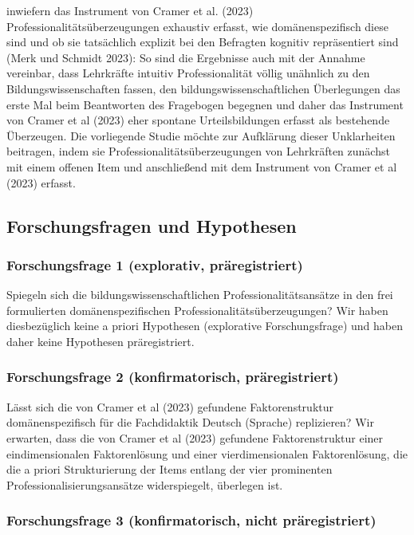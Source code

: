 \documentclass[
  letterpaper,
  DIV=11]{scrartcl}
\begin{document}
inwiefern das Instrument von Cramer et al. (2023)
Professionalitätsüberzeugungen exhaustiv erfasst, wie domänenspezifisch
diese sind und ob sie tatsächlich explizit bei den Befragten kognitiv
repräsentiert sind (Merk und Schmidt 2023): So sind die Ergebnisse auch
mit der Annahme vereinbar, dass Lehrkräfte intuitiv Professionalität
völlig unähnlich zu den Bildungswissenschaften fassen, den
bildungswissenschaftlichen Überlegungen das erste Mal beim Beantworten
des Fragebogen begegnen und daher das Instrument von Cramer et al (2023)
eher spontane Urteilsbildungen erfasst als bestehende Überzeugen. Die
vorliegende Studie möchte zur Aufklärung dieser Unklarheiten beitragen,
indem sie Professionalitätsüberzeugungen von Lehrkräften zunächst mit
einem offenen Item und anschließend mit dem Instrument von Cramer et al
(2023) erfasst.

\subsection{Forschungsfragen und
Hypothesen}\label{forschungsfragen-und-hypothesen}

\subsubsection{Forschungsfrage 1 (explorativ,
präregistriert)}\label{forschungsfrage-1-explorativ-pruxe4registriert}

Spiegeln sich die bildungswissenschaftlichen Professionalitätsansätze in
den frei formulierten domänenspezifischen
Professionalitätsüberzeugungen? Wir haben diesbezüglich keine a priori
Hypothesen (explorative Forschungsfrage) und haben daher keine
Hypothesen präregistriert.

\subsubsection{Forschungsfrage 2 (konfirmatorisch,
präregistriert)}\label{forschungsfrage-2-konfirmatorisch-pruxe4registriert}

Lässt sich die von Cramer et al (2023) gefundene Faktorenstruktur
domänenspezifisch für die Fachdidaktik Deutsch (Sprache) replizieren?
Wir erwarten, dass die von Cramer et al (2023) gefundene
Faktorenstruktur einer eindimensionalen Faktorenlösung und einer
vierdimensionalen Faktorenlösung, die die a priori Strukturierung der
Items entlang der vier prominenten Professionalisierungsansätze
widerspiegelt, überlegen ist.

\subsubsection{Forschungsfrage 3 (konfirmatorisch, nicht
präregistriert)}\label{forschungsfrage-3-konfirmatorisch-nicht-pruxe4registriert}
\end{document}
